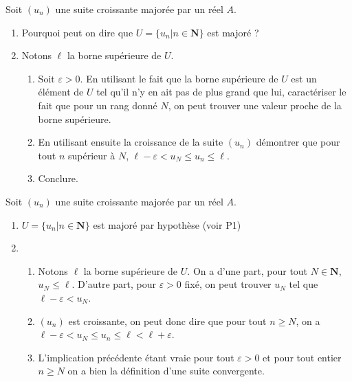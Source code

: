 \documentclass[12pt,a4paper,french]{article}
\newcommand{\N}{\mathbf{N}}
\theoremstyle{break}
\theoremstyle{plain}
\theoremstyle{nonumberplain}
\theoremstyle{nonumberbreak}
\begin{document}
\begin{question}[name=Démonstration,subtitle={Toute suite croissante
  majorée est convergente}]

  Soit $(u_n)$ une suite croissante majorée par un réel $A$.

  \begin{enumerate}
    \item Pourquoi peut on dire que $U = \{ u_n | n\in \N \}$ est majoré
      ?
    \item Notons $\ell$ la borne supérieure de $U$.

      \begin{enumerate}
        \item Soit $\varepsilon > 0$. En utilisant le fait que la borne
          supérieure de $U$ est un élément de $U$ tel qu'il n'y en ait
          pas de plus grand que lui, caractériser le fait que pour un
          rang donné $N$, on peut trouver une valeur proche de la borne
          supérieure.
        \item En utilisant ensuite la croissance de la suite $(u_n)$
          démontrer que pour tout $n$ supérieur à $N$, $\ell
          -\varepsilon < u_N \leqslant u_n \leqslant \ell$.
        \item Conclure.
      \end{enumerate}
  \end{enumerate}
\end{question}
\begin{solution}
  Soit $(u_n)$ une suite croissante majorée par un réel $A$.

  \begin{enumerate}
    \item $U = \{ u_n | n\in \N \}$ est majoré par hypothèse (voir P1)
    \item
      \begin{enumerate}
        \item Notons $\ell$ la borne supérieure de $U$. On a d'une part,
          pour tout $N\in \N$, $u_N \leqslant \ell$. D'autre part, pour
          $\varepsilon > 0$ fixé, on peut trouver $u_N$ tel que $\ell -
          \varepsilon < u_N$.
        \item $(u_n)$ est croissante, on peut donc dire que pour tout
          $n \geqslant N$, on a $\ell - \varepsilon < u_N
          \leqslant u_n \leqslant \ell < \ell + \varepsilon$.
        \item L'implication précédente étant vraie pour tout
          $\varepsilon > 0$ et pour tout entier $n \geqslant N$ on a
          bien la définition d'une suite convergente.
      \end{enumerate}
  \end{enumerate}
\end{solution}
\end{document}
